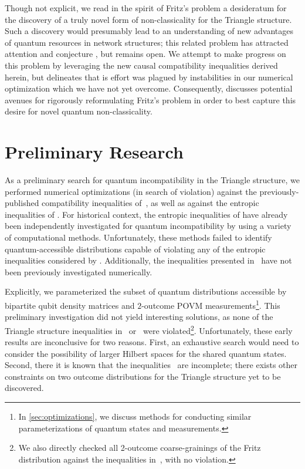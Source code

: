 \documentclass[aps, 10pt, english, twoside, pra, nofootinbib, tightenlines, longbibliography, superscriptaddress]{revtex4-1}
\begin{document}
    Though not explicit, we read in the spirit of Fritz's problem a desideratum for the discovery of a truly novel form of non-classicality for the Triangle structure. Such a discovery would presumably lead to an understanding of new advantages of quantum resources in network structures; this related problem has attracted attention and conjecture \cite{Gisin_2017}, but remains open. We attempt to make progress on this problem by leveraging the new causal compatibility inequalities derived herein, but  delineates that is effort was plagued by instabilities in our numerical optimization which we have not yet overcome. Consequently,  discusses potential avenues for rigorously reformulating Fritz's problem in order to best capture this desire for novel quantum non-classicality.

    \section{Preliminary Research}
    \label{sec:preliminary_research}

    As a preliminary search for quantum incompatibility in the Triangle structure, we performed numerical optimizations (in search of violation) against the previously-published compatibility inequalities of~\citet{Inflation}, as well as against the entropic inequalities of \citet{Henson_2014}. For historical context, the entropic inequalities of \cite{Henson_2014} have already been independently investigated for quantum incompatibility by \citet{Weilenmann_2016} using a variety of computational methods. Unfortunately, these methods failed to identify quantum-accessible distributions capable of violating any of the entropic inequalities considered by \cite{Weilenmann_2016}. Additionally, the inequalities presented in~\cite{Inflation} have not been previously investigated numerically.

    Explicitly, we parameterized the subset of quantum distributions accessible by bipartite qubit density matrices and $2$-outcome POVM measurements\footnote{In \cref{sec:optimizations}, we discuss methods for conducting similar parameterizations of quantum states and measurements.}. This preliminary investigation did not yield interesting solutions, as none of the Triangle structure inequalities in~\cite{Inflation} or~\cite{Henson_2014} were violated\footnote{We also directly checked all 2-outcome coarse-grainings of the Fritz distribution against the inequalities in~\cite{Inflation,Henson_2014}, with no violation.}. Unfortunately, these early results are inconclusive for two reasons. First, an exhaustive search would need to consider the possibility of larger Hilbert spaces for the shared quantum states. Second, there it is known that the inequalities~\cite{Inflation} are incomplete; there exists other constraints on two outcome distributions for the Triangle structure yet to be discovered.
\end{document}

